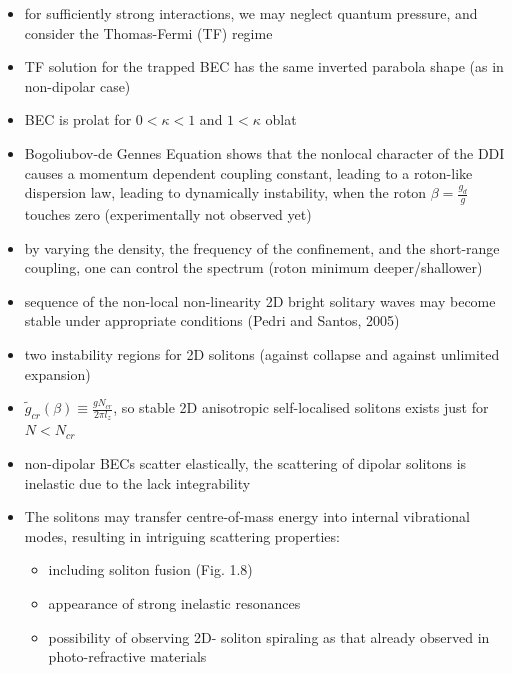 \begin{itemize}
    \item for sufficiently strong interactions, we may neglect quantum pressure,
        and consider the Thomas-Fermi (TF) regime
    \item TF solution for the trapped BEC has the same inverted parabola shape (as in non-dipolar case)
    \item BEC is prolat for $0 < \kappa < 1$ and $1 < \kappa$ oblat
    \item Bogoliubov-de Gennes Equation shows that the nonlocal character of the DDI causes a momentum
        dependent coupling constant, leading to a roton-like dispersion law, leading to dynamically instability,
        when the roton $\beta = \frac{g_{d}}{g}$ touches zero (experimentally not observed yet)
    \item by varying the density, the frequency of the confinement, and the short-range coupling,
        one can control the spectrum (roton minimum deeper/shallower)
    \item sequence of the non-local non-linearity 2D bright solitary waves may become stable
        under appropriate conditions (Pedri and Santos, 2005)
    \item two instability regions for 2D solitons (against collapse and against unlimited expansion)
    \item $\tilde{g}_{cr}(\beta) \equiv \frac{g N_{cr}}{2 \pi l_{z}}$,
        so stable 2D anisotropic self-localised solitons exists just for $N < N_{cr}$
    \item non-dipolar BECs scatter elastically, the scattering of dipolar solitons is inelastic due to
        the lack integrability
    \item The solitons may transfer centre-of-mass energy into internal vibrational modes,
        resulting in intriguing scattering properties:

    \begin{itemize}
      \item including soliton fusion (Fig. 1.8)
      \item appearance of strong inelastic resonances
      \item possibility of observing 2D- soliton spiraling as that already observed in photo-refractive materials
    \end{itemize}


\end{itemize}
